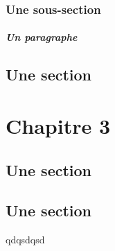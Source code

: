 \documentclass{book}
\begin{document}
            \subsection{Une sous-section}
                \paragraph{Un paragraphe}
        \section{Une section}
    \chapter{Chapitre 3}
        \section{Une section}
        \section{Une section}
      
  qdqsdqsd  

\printglossary[nonumberlist]
\end{document}
